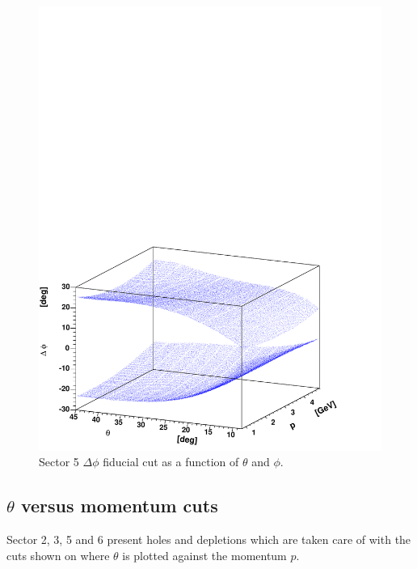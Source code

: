 \begin{figure}[h]
 \begin{center}
 \includegraphics[width = 13cm, bb=0 0 540 380]{data_reduction/img/fid_p_sector5}   
  \caption[Sector 5 $\Delta\phi$ fiducial cut as a function of $\theta$ and $\phi$]
          { Sector 5 $\Delta\phi$ fiducial cut as a function of $\theta$ and $\phi$.}
 \label{fig:fid_p_sector5}
 \end{center}
\end{figure}

\cia

\subsection{ $\theta$ versus momentum cuts}
Sector 2, 3, 5 and 6 present holes and depletions which are taken care of with the 
cuts shown on  where $\theta$ is plotted against the momentum $p$.

